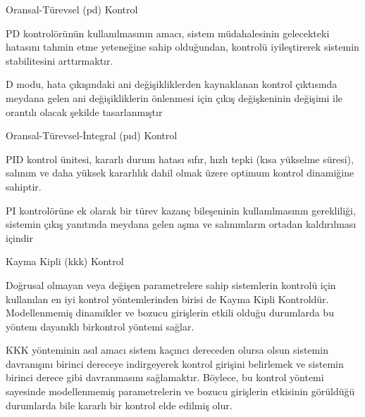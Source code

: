 \documentclass{beamer}
\begin{document}
\begin{frame}
\begin{block}{Oransal-Türevsel (pd) Kontrol}
\item PD kontrolörünün kullanılmasının amacı, sistem müdahalesinin gelecekteki hatasını tahmin etme yeteneğine sahip olduğundan, kontrolü iyileştirerek sistemin stabilitesini arttırmaktır. 

\item D modu, hata çıkışındaki ani değişikliklerden kaynaklanan kontrol çıktısında meydana gelen ani değişikliklerin önlenmesi için çıkış değişkeninin değişimi ile orantılı olacak şekilde tasarlanmıştır
\end{block}
\end{frame}

\begin{frame}
\begin{block}{Oransal-Türevsel-İntegral (pıd) Kontrol}
\item PID kontrol ünitesi, kararlı durum hatası sıfır, hızlı tepki (kısa yükselme süresi), salınım ve daha yüksek kararlılık dahil olmak üzere optimum kontrol dinamiğine sahiptir.

\item PI kontrolörüne ek olarak bir türev kazanç bileşeninin kullanılmasının gerekliliği, sistemin çıkış yanıtında meydana gelen aşma ve salınımların ortadan kaldırılması içindir
\end{block}
\end{frame}

\begin{frame}
\begin{block}{Kayma Kipli (kkk) Kontrol}
\item Doğrusal olmayan veya değişen parametrelere sahip sistemlerin kontrolü için kullanılan en iyi kontrol yöntemlerinden birisi de Kayma Kipli Kontroldür. Modellenmemiş dinamikler ve bozucu girişlerin etkili olduğu durumlarda bu yöntem dayanıklı birkontrol yöntemi sağlar. 

\item KKK yönteminin asıl amacı sistem kaçıncı dereceden olursa olsun sistemin davranışını birinci dereceye
indirgeyerek kontrol girişini belirlemek ve sistemin birinci derece gibi davranmasını sağlamaktır. Böylece, bu kontrol yöntemi sayesinde modellenmemiş parametrelerin ve bozucu girişlerin etkisinin görüldüğü durumlarda bile kararlı bir kontrol elde edilmiş olur.
\end{block}
\end{frame}
\end{document}
